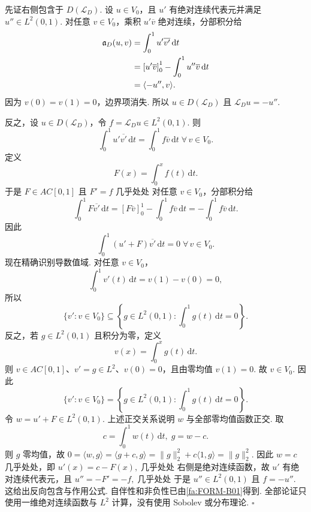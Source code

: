 \begin{FAProof}
先证右侧包含于 \(\displaystyle D(\mathcal L_D)\). 设 \(\displaystyle u\in V_0\)，且 \(\displaystyle u'\) 有绝对连续代表元并满足 \(\displaystyle u''\in L^2(0,1)\). 对任意 \(\displaystyle v\in V_0\)，乘积 \(\displaystyle u'\overline v\) 绝对连续，分部积分给
\[
\begin{aligned}
\displaystyle \mathfrak a_D(u,v) &\displaystyle = \int_0^1u'\overline{v'}\,\mathrm{d}t\\
\displaystyle &\displaystyle = \left[u'\overline v\right]_0^1 - \int_0^1u''\overline v\,\mathrm{d}t\\
\displaystyle &\displaystyle = \langle-u'',v\rangle.
\end{aligned}
\]
因为 \(\displaystyle v(0)=v(1)=0\)，边界项消失. 所以 \(\displaystyle u\in D(\mathcal L_D)\) 且 \(\displaystyle\mathcal L_Du=-u''\).

反之，设 \(\displaystyle u\in D(\mathcal L_D)\)，令 \(\displaystyle f=\mathcal L_Du\in L^2(0,1)\). 则
\[
\int_0^1u'\overline{v'}\,\mathrm{d}t
=
\int_0^1f\overline v\,\mathrm{d}t
\;
\forall\,v\in V_0.
\]
定义
\[
F(x)=\int_0^x f(t)\,\mathrm{d}t.
\]
于是 \(\displaystyle F\in AC[0,1]\) 且 \(\displaystyle F'=f\) 几乎处处 对任意 \(\displaystyle v\in V_0\)，分部积分给
\[
\int_0^1F\overline{v'}\,\mathrm{d}t
=
\left[F\overline v\right]_0^1
-
\int_0^1f\overline v\,\mathrm{d}t
=
-
\int_0^1f\overline v\,\mathrm{d}t.
\]
因此
\[
\int_0^1(u'+F)\overline{v'}\,\mathrm{d}t
=
0
\;
\forall\,v\in V_0.
\]
现在精确识别导数值域. 对任意 \(\displaystyle v\in V_0\)，
\[
\int_0^1v'(t)\,\mathrm{d}t
=
v(1)-v(0)
=
0,
\]
所以
\[
\{v':v\in V_0\}
\subseteq
\left\{
 g\in L^2(0,1):\int_0^1g(t)\,\mathrm{d}t=0
\right\}.
\]
反之，若 \(\displaystyle g\in L^2(0,1)\) 且积分为零，定义
\[
v(x)=\int_0^x g(t)\,\mathrm{d}t.
\]
则 \(\displaystyle v\in AC[0,1]\)、\(\displaystyle v'=g\in L^2\)、\(\displaystyle v(0)=0\)，且由零均值 \(\displaystyle v(1)=0\). 故 \(\displaystyle v\in V_0\). 因此
\[
\{v':v\in V_0\}
=
\left\{
 g\in L^2(0,1):\int_0^1g(t)\,\mathrm{d}t=0
\right\}.
\]
令 \(\displaystyle w=u'+F\in L^2(0,1)\). 上述正交关系说明 \(\displaystyle w\) 与全部零均值函数正交. 取
\[
c=\int_0^1w(t)\,\mathrm{d}t,
\;
g=w-c.
\]
则 \(\displaystyle g\) 零均值，故
\(\displaystyle 0 = \langle w,g\rangle = \langle g+c,g\rangle = \|g\|_2^2+c\langle1,g\rangle = \|g\|_2^2.\)
因此 \(\displaystyle w=c\) 几乎处处，即
\(\displaystyle u'(x)=c-F(x) ,\;\text{几乎处处}\)
右侧是绝对连续函数，故 \(\displaystyle u'\) 有绝对连续代表元，且
\(\displaystyle u''=-F'=-f ,\;\text{几乎处处}\)
于是 \(\displaystyle u''\in L^2(0,1)\) 且 \(\displaystyle f=-u''\). 这给出反向包含与作用公式. 自伴性和非负性已由\autoref{fa:FORM-B01}得到. 全部论证只使用一维绝对连续函数与 \(\displaystyle L^2\) 计算，没有使用 Sobolev 或分布理论.
\hfill\(\square\)
\end{FAProof}

